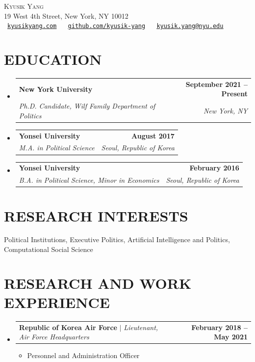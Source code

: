 \documentclass[a4paper,11pt]{article}
\makeatletter
\newcommand{\resumeItem}[1]{
  \item\small{
    {#1 \vspace{-2pt}}
  }
}
\newcommand{\resumeSubheading}[4]{
  \vspace{-2pt}\item
    \begin{tabular*}{1.0\textwidth}[t]{l@{\extracolsep{\fill}}r}
      \textbf{#1} & \textbf{\small #2} \\
      \textit{\small#3} & \textit{\small #4} \\
    \end{tabular*}\vspace{-7pt}
}
\newcommand{\resumeProjectHeading}[2]{
    \item
    \begin{tabular*}{1.001\textwidth}{l@{\extracolsep{\fill}}r}
      \small#1 & \textbf{\small #2}\\
    \end{tabular*}\vspace{-7pt}
}
\newcommand{\resumeSubHeadingListStart}{\begin{itemize}[leftmargin=0.0in, label={}]}
\newcommand{\resumeSubHeadingListEnd}{\end{itemize}}
\newcommand{\resumeItemListStart}{\begin{itemize}}
\newcommand{\resumeItemListEnd}{\end{itemize}\vspace{-5pt}}
\makeatother
\begin{document}
\begin{center}
    {\Huge \scshape Kyusik Yang} \\[5pt]
    19 West 4th Street, New York, NY 10012 \\[3pt]

    \raisebox{-0.2\height}{\faUser}\ \href{https://kyusikyang.com}{\texttt{\underline{kyusikyang.com}}} ~
    \raisebox{-0.2\height}{\faGithub}\ \href{https://github.com/kyusik-yang}{\texttt{\underline{github.com/kyusik-yang}}} ~
    \raisebox{-0.2\height}{\faEnvelope}\ \href{mailto:kyusik.yang@nyu.edu}{\texttt{\underline{kyusik.yang@nyu.edu}}}

    \vspace{-3pt}
\end{center}


\section{EDUCATION}
  \resumeSubHeadingListStart
    \resumeSubheading
      {New York University}{September 2021 -- Present}
      {Ph.D. Candidate, Wilf Family Department of Politics}{New York, NY}
    \resumeSubheading
      {Yonsei University}{August 2017}
      {M.A. in Political Science}{Seoul, Republic of Korea}
    \resumeSubheading
      {Yonsei University}{February 2016}
      {B.A. in Political Science, Minor in Economics}{Seoul, Republic of Korea} \vspace{0pt}
  \resumeSubHeadingListEnd

\section{RESEARCH INTERESTS}
Political Institutions, Executive Politics, Artificial Intelligence and Politics, Computational Social Science
 \vspace{0pt}




\section{RESEARCH AND WORK EXPERIENCE}
    \vspace{-4pt}
    \resumeSubHeadingListStart
      \resumeProjectHeading
          {\textbf{Republic of Korea Air Force} $|$ \emph{Lieutenant, Air Force Headquarters}}{February 2018 -- May 2021}
           \resumeItemListStart
            \resumeItem{Personnel and Administration Officer}
          \resumeItemListEnd
    \resumeSubHeadingListEnd
\vspace{0pt}
\end{document}

